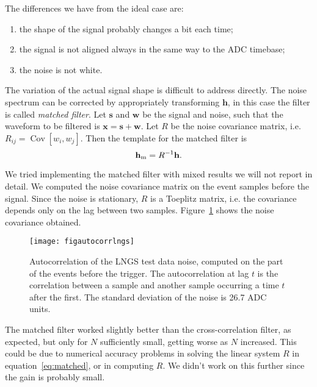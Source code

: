 The differences we have from the ideal case are:
\begin{enumerate}
    \item the shape of the signal probably changes a bit each time;
    \item the signal is not aligned always in the same way to the ADC timebase;
    \item the noise is not white.
\end{enumerate}

The variation of the actual signal shape is difficult to address directly. The
noise spectrum can be corrected by appropriately transforming $\mathbf h$, in
this case the filter is called \emph{matched filter}. Let $\mathbf s$ and
$\mathbf w$ be the signal and noise, such that the waveform to be filtered is
$\mathbf x = \mathbf s + \mathbf w$. Let $R$ be the noise covariance matrix,
i.e. $R_{ij} = \operatorname{Cov}[w_i, w_j]$. Then the template for the matched
filter is
\begin{equation}
    \mathbf h_\text m = R^{-1} \mathbf h.
    \label{eq:matched}    
\end{equation}

We tried implementing the matched filter with mixed results we will not report
in detail. We computed the noise covariance matrix on the event samples before
the signal. Since the noise is stationary, $R$ is a Toeplitz matrix, i.e. the
covariance depends only on the lag between two samples.
Figure~\ref{fig:autocorrlngs} shows the noise covariance obtained.

\begin{figure}
    \hspace{0.00\textwidth}
    \texttt{[image: figautocorrlngs]}
    
    \caption{Autocorrelation of the LNGS test data noise, computed on the part
    of the events before the trigger. The autocorrelation at lag $t$ is the
    correlation between a sample and another sample occurring a time $t$ after
    the first. The standard deviation of the noise is 26.7 ADC units.}
    
    \label{fig:autocorrlngs}
\end{figure}

The matched filter worked slightly better than the cross-correlation filter, as
expected, but only for $N$ sufficiently small, getting worse as $N$ increased.
This could be due to numerical accuracy problems in solving the linear system
$R$ in equation~\ref{eq:matched}, or in computing $R$. We didn't work on this
further since the gain is probably small.

